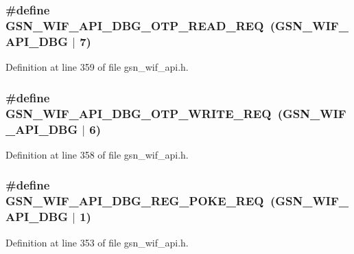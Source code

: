 \hypertarget{a00606_ab417c596bf5f77e5ebc3e01b5be56201}{
\subsubsection[{GSN\_\-WIF\_\-API\_\-DBG\_\-OTP\_\-READ\_\-REQ}]{\setlength{\rightskip}{0pt plus 5cm}\#define GSN\_\-WIF\_\-API\_\-DBG\_\-OTP\_\-READ\_\-REQ~(GSN\_\-WIF\_\-API\_\-DBG $|$ 7)}}
\label{a00606_ab417c596bf5f77e5ebc3e01b5be56201}


Definition at line 359 of file gsn\_\-wif\_\-api.h.

\hypertarget{a00606_a11de83e81df9fc11e0ec10df5b8ac7d2}{
\subsubsection[{GSN\_\-WIF\_\-API\_\-DBG\_\-OTP\_\-WRITE\_\-REQ}]{\setlength{\rightskip}{0pt plus 5cm}\#define GSN\_\-WIF\_\-API\_\-DBG\_\-OTP\_\-WRITE\_\-REQ~(GSN\_\-WIF\_\-API\_\-DBG $|$ 6)}}
\label{a00606_a11de83e81df9fc11e0ec10df5b8ac7d2}


Definition at line 358 of file gsn\_\-wif\_\-api.h.

\hypertarget{a00606_aab1f1b84f54eb7e095cccb3230190801}{
\subsubsection[{GSN\_\-WIF\_\-API\_\-DBG\_\-REG\_\-POKE\_\-REQ}]{\setlength{\rightskip}{0pt plus 5cm}\#define GSN\_\-WIF\_\-API\_\-DBG\_\-REG\_\-POKE\_\-REQ~(GSN\_\-WIF\_\-API\_\-DBG $|$ 1)}}
\label{a00606_aab1f1b84f54eb7e095cccb3230190801}


Definition at line 353 of file gsn\_\-wif\_\-api.h.

